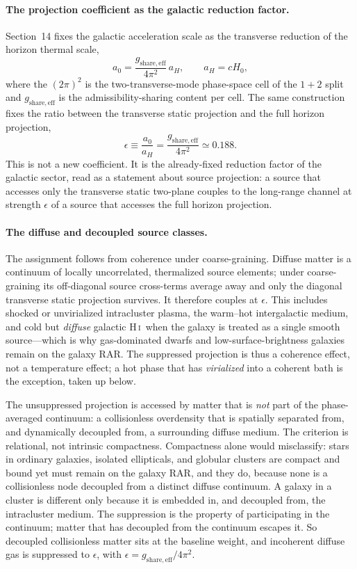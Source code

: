 \documentclass[11pt]{article}
\begin{document}
\paragraph{The projection coefficient as the galactic reduction factor.}
Section~14 fixes the galactic acceleration scale as the transverse reduction of the horizon thermal scale,
\[
a_0=\frac{g_{\mathrm{share,eff}}}{4\pi^2}\,a_H,
\qquad
a_H=cH_0 ,
\]
where the $(2\pi)^2$ is the two-transverse-mode phase-space cell of the $1+2$ split and $g_{\mathrm{share,eff}}$ is the admissibility-sharing content per cell. The same construction fixes the ratio between the transverse static projection and the full horizon projection,
\[
\epsilon
\equiv
\frac{a_0}{a_H}
=
\frac{g_{\mathrm{share,eff}}}{4\pi^2}
\simeq 0.188 .
\]
This is not a new coefficient. It is the already-fixed reduction factor of the galactic sector, read as a statement about source projection: a source that accesses only the transverse static two-plane couples to the long-range channel at strength $\epsilon$ of a source that accesses the full horizon projection.

\paragraph{The diffuse and decoupled source classes.}
The assignment follows from coherence under coarse-graining. Diffuse matter is a continuum of locally uncorrelated, thermalized source elements; under coarse-graining its off-diagonal source cross-terms average away and only the diagonal transverse static projection survives. It therefore couples at $\epsilon$. This includes shocked or unvirialized intracluster plasma, the warm--hot intergalactic medium, and cold but \emph{diffuse} galactic H\,\textsc{i}\ when the galaxy is treated as a single smooth source---which is why gas-dominated dwarfs and low-surface-brightness galaxies remain on the galaxy RAR. The suppressed projection is thus a coherence effect, not a temperature effect; a hot phase that has \emph{virialized} into a coherent bath is the exception, taken up below.

The unsuppressed projection is accessed by matter that is \emph{not} part of the phase-averaged continuum: a collisionless overdensity that is spatially separated from, and dynamically decoupled from, a surrounding diffuse medium. The criterion is relational, not intrinsic compactness. Compactness alone would misclassify: stars in ordinary galaxies, isolated ellipticals, and globular clusters are compact and bound yet must remain on the galaxy RAR, and they do, because none is a collisionless node decoupled from a distinct diffuse continuum. A galaxy in a cluster is different only because it is embedded in, and decoupled from, the intracluster medium. The suppression is the property of participating in the continuum; matter that has decoupled from the continuum escapes it. So decoupled collisionless matter sits at the baseline weight, and incoherent diffuse gas is suppressed to $\epsilon$, with $\epsilon=g_{\mathrm{share,eff}}/4\pi^2$.
\end{document}
